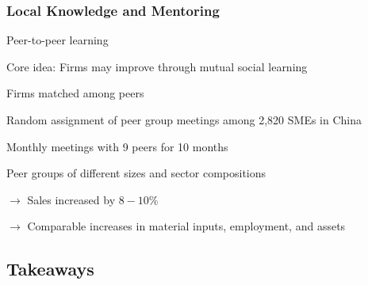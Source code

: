 \documentclass[hideothersubsections, usenames,dvipsnames,11pt]{beamer}
\newenvironment{itemize_2pt}{\itemize\addtolength{\itemsep}{2pt}}{\enditemize}
\begin{document}
\begin{frame}
\frametitle{Local Knowledge and Mentoring}

Peer-to-peer learning

\begin{itemize_2pt}
	\item Core idea: \textcolor{bdf}{Firms may improve through mutual social learning}
	
	\vspace{0.5em}
	
	\item Firms matched among peers \citep{Cai2018}
	\begin{itemize_2pt}
		\item Random assignment of \textcolor{bdf}{peer group meetings} among 2,820 SMEs in China
		\item Monthly meetings with 9 peers for 10 months
		\item Peer groups of different sizes and sector compositions
		
		\vspace{0.5em}
		
		\item[] $\rightarrow$ \textcolor{bdf}{Sales increased by $8-10\%$} 
		\item[] $\rightarrow$ Comparable increases in material inputs, employment, and assets

	\end{itemize_2pt}

\end{itemize_2pt}


\end{frame}






\subsection{Takeaways}
\end{document}
